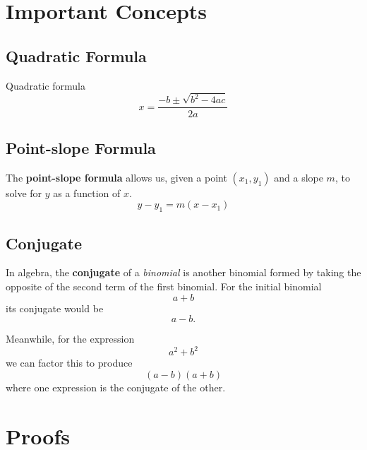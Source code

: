 \chapter{Important Concepts}

\section{Quadratic Formula}
Quadratic formula
\begin{equation}
  x=\frac{-b\pm\sqrt{b^2-4ac}}{2a}
  \label{app:eq:quadratic}
\end{equation}

\section{Point-slope Formula}
The \textbf{point-slope formula} allows us, given a point $(x_1, y_1)$ and a slope $m$, to solve for $y$ as a function of $x$.
\begin{equation}
  \label{eq:pointslope}
  y-y_1=m(x-x_1)
\end{equation}


\section{Conjugate}\label{app:def:conjugate}
In algebra, the \textbf{conjugate} of a \emph{binomial} is another binomial formed by taking the opposite of the second term of the first binomial. For the initial binomial
\[ a + b\]
its conjugate would be
\[a - b.\]

Meanwhile, for the expression \[a^2+b^2\] we can factor this to produce \[(a-b)(a+b)\] where one expression is the conjugate of the other.

\chapter{Proofs}

